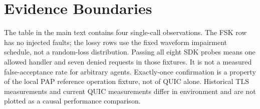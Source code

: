 \section{Evidence Boundaries}
The table in the main text contains four single-call observations. The FSK
row has no injected faults; the lossy rows use the fixed waveform impairment
schedule, not a random-loss distribution. Passing all eight SDK probes means
one allowed handler and seven denied requests in those fixtures. It is not a
measured false-acceptance rate for arbitrary agents. Exactly-once confirmation
is a property of the local PAP reference operation fixture, not of QUIC alone.
Historical TLS measurements and current QUIC measurements differ in environment
and are not plotted as a causal performance comparison.
